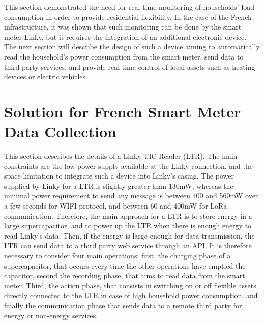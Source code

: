 \documentclass[conference]{IEEEtran}
\begin{document}
This section demonstrated the need for real-time monitoring of households' load consumption in order to provide residential flexibility.
In the case of the French infrastructure, it was shown that such monitoring can be done by the smart meter Linky, but it requires the integration of an additional electronic device. %
  The next section will describe the design of such a device aiming to automatically read the household's power consumption from the smart meter, send data to third party services, and provide real-time control of local assets such as heating devices or electric vehicles.


\section{Solution for French Smart Meter Data Collection}
\label{section:solution}
This section describes the details of a Linky TIC Reader (LTR). The main constraints  
 are the low power supply available at the Linky connection, and the space limitation %
 to integrate such a device into Linky's casing. The power supplied by Linky for a LTR is slightly greater than 130mW, whereas the minimal power requirement to send any message is between 400 and 560mW over a few seconds for WIFI protocol, and between 60 and 400mW for LoRa communication. Therefore, the main approach for a LTR is to store energy in a large supercapacitor, and to power up the LTR when there is enough energy to read Linky's data. Then, if the energy is large enough for data transmission, the LTR can send data to a third party web service through an API. It is therefore necessary to consider four main operations: first, the charging phase of a supercapacitor, that occurs every time the other operations have emptied the capacitor, second the recording phase, that aims to read data from the smart meter. Third, the action phase, that consists in switching on or off flexible assets directly connected to the LTR in case of high household power consumption, and finally the communication phase that sends data to a remote third party for energy or non-energy services. 
\end{document}
